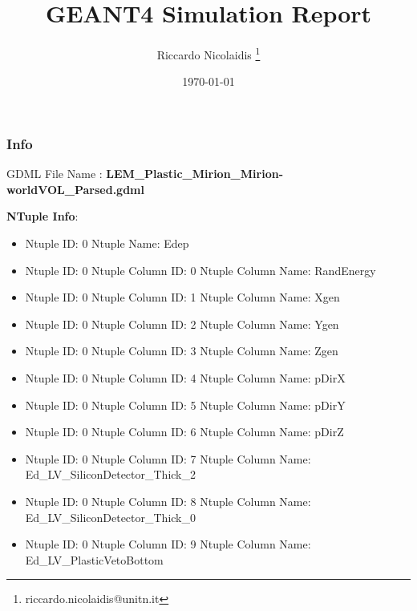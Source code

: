 \documentclass[8pt]{beamer}
\title{GEANT4 Simulation Report}
\author{Riccardo Nicolaidis \footnote{riccardo.nicolaidis@unitn.it}}
\date{\today}
\begin{document}
        
            \begin{frame}
                \titlepage
            \end{frame}
            
            \begin{frame}
                \frametitle{Info}
            
                \centering
                GDML File Name : \textbf{ LEM\_Plastic\_Mirion\_Mirion-worldVOL\_Parsed.gdml}
                
                
                \vspace{2 cm}
                \textbf{NTuple Info}:
                \vspace{1 cm}
                
        \begin{itemize}
        
        \item Ntuple ID: 0 Ntuple Name: Edep
        
        \item Ntuple ID: 0 Ntuple Column ID: 0 Ntuple Column Name: RandEnergy
        
        \item Ntuple ID: 0 Ntuple Column ID: 1 Ntuple Column Name: Xgen
        
        \item Ntuple ID: 0 Ntuple Column ID: 2 Ntuple Column Name: Ygen
        
        \item Ntuple ID: 0 Ntuple Column ID: 3 Ntuple Column Name: Zgen
        
        \item Ntuple ID: 0 Ntuple Column ID: 4 Ntuple Column Name: pDirX
        
        \item Ntuple ID: 0 Ntuple Column ID: 5 Ntuple Column Name: pDirY
        
        \item Ntuple ID: 0 Ntuple Column ID: 6 Ntuple Column Name: pDirZ
        
        \item Ntuple ID: 0 Ntuple Column ID: 7 Ntuple Column Name: Ed\_LV\_SiliconDetector\_Thick\_2
        
        \item Ntuple ID: 0 Ntuple Column ID: 8 Ntuple Column Name: Ed\_LV\_SiliconDetector\_Thick\_0
        
        \item Ntuple ID: 0 Ntuple Column ID: 9 Ntuple Column Name: Ed\_LV\_PlasticVetoBottom
        

\end{itemize}
\end{frame}
\end{document}
